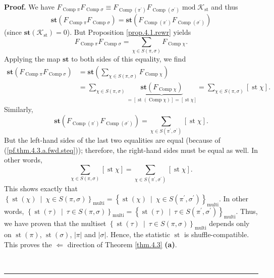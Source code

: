 \documentclass[numbers=enddot,12pt,final,onecolumn,notitlepage]{scrartcl}%
\theoremstyle{definition}
\newenvironment{proof}[1][Proof]{\noindent\textbf{#1.} }{\ \rule{0.5em}{0.5em}}
\let\sumnonlimits\sum
\renewcommand{\sum}{\sumnonlimits\limits}
\begin{document}
\begin{proof}
We have $F_{\operatorname*{Comp}\pi}F_{\operatorname*{Comp}\sigma}\equiv
F_{\operatorname*{Comp}\left(  \pi^{\prime}\right)  }F_{\operatorname*{Comp}%
\left(  \sigma^{\prime}\right)  }\operatorname{mod}\mathcal{K}%
_{\operatorname*{st}}$ and thus%
\begin{equation}
\mathbf{st}\left(  F_{\operatorname*{Comp}\pi}F_{\operatorname*{Comp}\sigma
}\right)  =\mathbf{st}\left(  F_{\operatorname*{Comp}\left(  \pi^{\prime
}\right)  }F_{\operatorname*{Comp}\left(  \sigma^{\prime}\right)  }\right)
\label{pf.thm.4.3.a.fwd.steq}%
\end{equation}
(since $\mathbf{st}\left(  \mathcal{K}_{\operatorname*{st}}\right)  =0$). But
Proposition \ref{prop.4.1.rewr} yields%
\[
F_{\operatorname*{Comp}\pi}F_{\operatorname*{Comp}\sigma}=\sum_{\chi\in
S\left(  \pi,\sigma\right)  }F_{\operatorname*{Comp}\chi}.
\]
Applying the map $\mathbf{st}$ to both sides of this equality, we find%
\begin{align*}
\mathbf{st}\left(  F_{\operatorname*{Comp}\pi}F_{\operatorname*{Comp}\sigma
}\right)   &  =\mathbf{st}\left(  \sum_{\chi\in S\left(  \pi,\sigma\right)
}F_{\operatorname*{Comp}\chi}\right) \\
&  =\sum_{\chi\in S\left(  \pi,\sigma\right)  }\underbrace{\mathbf{st}\left(
F_{\operatorname*{Comp}\chi}\right)  }_{=\left[  \operatorname*{st}\left(
\operatorname*{Comp}\chi\right)  \right]  =\left[  \operatorname*{st}%
\chi\right]  }=\sum_{\chi\in S\left(  \pi,\sigma\right)  }\left[
\operatorname*{st}\chi\right]  .
\end{align*}
Similarly,%
\[
\mathbf{st}\left(  F_{\operatorname*{Comp}\left(  \pi^{\prime}\right)
}F_{\operatorname*{Comp}\left(  \sigma^{\prime}\right)  }\right)  =\sum
_{\chi\in S\left(  \pi^{\prime},\sigma^{\prime}\right)  }\left[
\operatorname*{st}\chi\right]  .
\]
But the left-hand sides of the last two equalities are equal (because of
(\ref{pf.thm.4.3.a.fwd.steq})); therefore, the right-hand sides must be equal
as well. In other words,
\[
\sum_{\chi\in S\left(  \pi,\sigma\right)  }\left[  \operatorname*{st}%
\chi\right]  =\sum_{\chi\in S\left(  \pi^{\prime},\sigma^{\prime}\right)
}\left[  \operatorname*{st}\chi\right]  .
\]
This shows exactly that $\left\{  \operatorname*{st}\left(  \chi\right)
\ \mid\ \chi\in S\left(  \pi,\sigma\right)  \right\}  _{\operatorname*{multi}}
=\left\{  \operatorname*{st}\left(  \chi\right)  \ \mid\ \chi\in S\left(
\pi^{\prime},\sigma^{\prime}\right)  \right\}  _{\operatorname*{multi}} $. In
other words, $\left\{  \operatorname*{st}\left(  \tau\right)  \ \mid\ \tau\in
S\left(  \pi,\sigma\right)  \right\}  _{\operatorname*{multi}} =\left\{
\operatorname*{st}\left(  \tau\right)  \ \mid\ \tau\in S\left(  \pi^{\prime
},\sigma^{\prime}\right)  \right\}  _{\operatorname*{multi}} $. Thus, we have
proven that the multiset $\left\{  \operatorname*{st}\left(  \tau\right)
\ \mid\ \tau\in S\left(  \pi,\sigma\right)  \right\}  _{\operatorname*{multi}}
$ depends only on $\operatorname*{st}\left(  \pi\right)  $,
$\operatorname*{st}\left(  \sigma\right)  $, $\left\vert \pi\right\vert $ and
$\left\vert \sigma\right\vert $. Hence, the statistic $\operatorname*{st}$ is
shuffle-compatible. This proves the $\Longleftarrow$ direction of Theorem
\ref{thm.4.3} \textbf{(a)}.


\end{proof}
\end{document}
